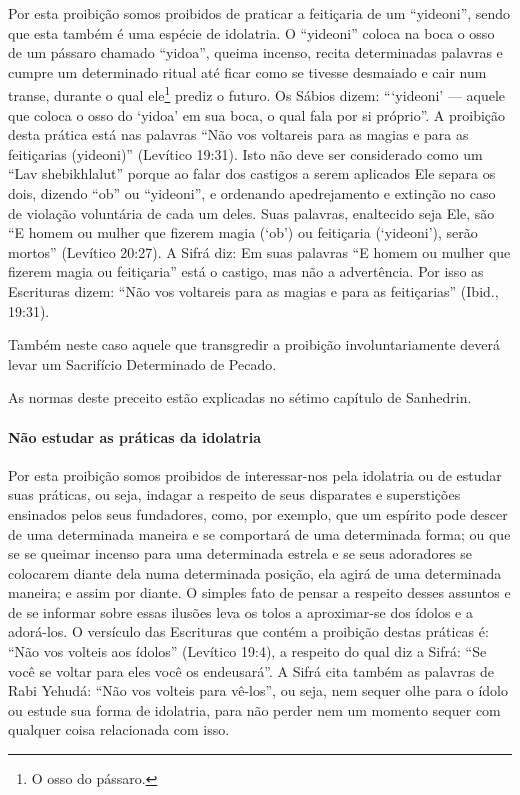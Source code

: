 Por esta proibição somos proibidos de praticar a feitiçaria de um
``yideoni'', sendo que esta também é uma espécie de idolatria. O
``yideoni'' coloca na boca o osso de um pássaro chamado ``yidoa'',
queima incenso, recita determinadas palavras e cumpre um determinado
ritual até ficar como se tivesse desmaiado e cair num transe, durante o
qual ele\footnote{O osso do pássaro.} prediz o futuro. Os Sábios dizem:
```yideoni' --- aquele que coloca o osso do `yidoa' em sua boca, o qual
fala por si próprio''. A proibição desta prática está nas palavras ``Não
vos voltareis para as magias e para as feitiçarias (yideoni)''
(Levítico 19:31). Isto não deve ser considerado como um ``Lav
shebikhlalut'' porque ao falar dos castigos a serem aplicados Ele separa
os dois, dizendo ``ob'' ou ``yideoni'', e ordenando apedrejamento e
extinção no caso de violação voluntária de cada um deles. Suas palavras,
enaltecido seja Ele, são ``E homem ou mulher que fizerem magia (`ob') ou
feitiçaria (`yideoni'), serão mortos'' (Levítico 20:27). A Sifrá diz: Em
suas palavras ``E homem ou mulher que fizerem magia ou feitiçaria'' está
o castigo, mas não a advertência. Por isso as Escrituras dizem: ``Não
vos voltareis para as magias e para as feitiçarias'' (Ibid., 19:31).

Também neste caso aquele que transgredir a proibição involuntariamente
deverá levar um Sacrifício Determinado de Pecado.

As normas deste preceito estão explicadas no sétimo capítulo de Sanhedrin.

\paragraph{Não estudar as práticas da idolatria}

Por esta proibição somos proibidos de interessar-nos pela idolatria ou
de estudar suas práticas, ou seja, indagar a respeito de seus disparates
e superstições ensinados pelos seus fundadores, como, por exemplo, que
um espírito pode descer de uma determinada maneira e se comportará de
uma determinada forma; ou que se se queimar incenso para uma determinada
estrela e se seus adoradores se colocarem diante dela numa determinada
posição, ela agirá de uma determinada maneira; e assim por diante. O
simples fato de pensar a respeito desses assuntos e de se informar sobre
essas ilusões leva os tolos a aproximar-se dos ídolos e a adorá-los. O
versículo das Escrituras que contém a proibição destas práticas é:
``Não vos volteis aos ídolos'' (Levítico 19:4), a respeito do qual diz a
Sifrá: ``Se você se voltar para eles você os endeusará''. A Sifrá cita
também as palavras de Rabi Yehudá: ``Não vos volteis para vê-los'', ou seja,
nem sequer olhe para o ídolo ou estude sua forma de idolatria, para não
perder nem um momento sequer com qualquer coisa relacionada com isso.

